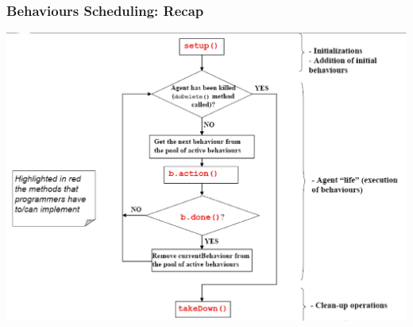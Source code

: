 \documentclass{beamer}\mode<presentation>{\usetheme{AMSCesenaPurpleAndGold}}
\begin{document}
\begin{frame}\frametitle{Behaviours Scheduling: Recap}
    \begin{center}
        \includegraphics[width=.75\textwidth]{res/img/jade_behaviour}
    \end{center}
\end{frame}
\end{document}
